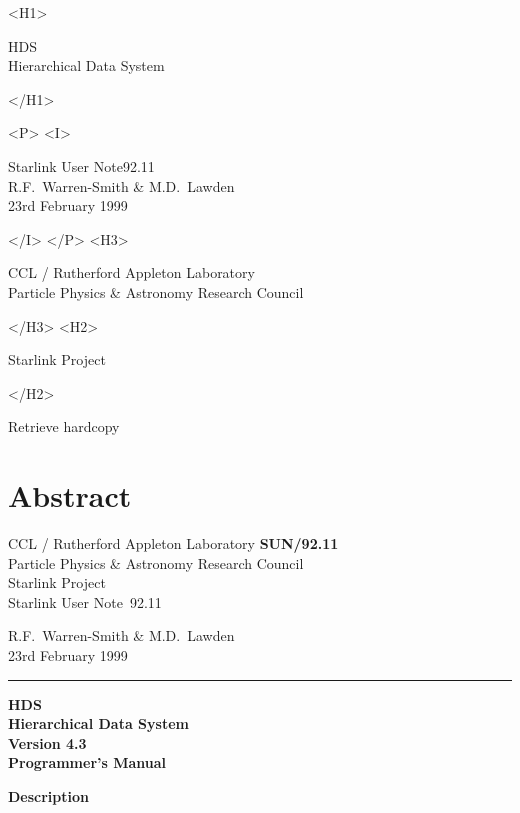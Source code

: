 \documentclass[11pt]{article}
\newcommand{\stardoccategory}  {Starlink User Note}
\newcommand{\stardocinitials}  {SUN}
\newcommand{\stardocsource}    {sun92.11}
\newcommand{\stardocnumber}    {92.11}
\newcommand{\stardocauthors}   {R.F.~Warren-Smith \& M.D.~Lawden}
\newcommand{\stardocdate}      {23rd February 1999}
\newcommand{\stardoctitle}     {HDS\\ [1ex]
                                Hierarchical Data System}
\newcommand{\stardocversion}   {Version 4.3}
\newcommand{\stardocmanual}    {Programmer's Manual}
\newcommand{\stardocname}{\stardocinitials /\stardocnumber}
\newcommand{\htmladdnormallink}[2]{#1}
\newcommand{\htmladdimg}[1]{}
\newenvironment{latexonly}{}{}
\newcommand{\xlabel}[1]{}
\begin{document}
\thispagestyle{empty}

\begin{htmlonly}
   \xlabel{}
   \label{stardoctoppage}
   \begin{rawhtml} <H1> \end{rawhtml}
      \stardoctitle
   \begin{rawhtml} </H1> \end{rawhtml}


   \begin{rawhtml} <P> <I> \end{rawhtml}
   \stardoccategory \stardocnumber \\
   \stardocauthors \\
   \stardocdate
   \begin{rawhtml} </I> </P> <H3> \end{rawhtml}
      \htmladdnormallink{CCL}{http://www.clrc.ac.uk/} /
      \htmladdnormallink{Rutherford Appleton Laboratory}
                        {http://www.clrc.ac.uk/ral/index.html} \\
      Particle Physics \& Astronomy Research Council \\
   \begin{rawhtml} </H3> <H2> \end{rawhtml}
      \htmladdnormallink{Starlink Project}{http://star-www.rl.ac.uk/}
   \begin{rawhtml} </H2> \end{rawhtml}
   \htmladdnormallink{\htmladdimg{source.gif} Retrieve hardcopy}
      {http://star-www.rl.ac.uk/cgi-bin/hcserver?\stardocsource}\\
   \section{\xlabel{abstract}Abstract}
\end{htmlonly}
\begin{latexonly}
   CCL / {\sc Rutherford Appleton Laboratory} \hfill {\bf \stardocname}\\
   {\large Particle Physics \& Astronomy Research Council}\\
   {\large Starlink Project\\}
   {\large \stardoccategory\ \stardocnumber}
   \begin{flushright}
   \stardocauthors\\
   \stardocdate
   \end{flushright}
   \vspace{-4mm}
   \rule{\textwidth}{0.5mm}
   \vspace{5mm}
   \begin{center}
   {\Huge\bf  \stardoctitle \\ [2.5ex]}
   {\LARGE\bf \stardocversion \\ [4ex]}
   {\Huge\bf  \stardocmanual}
   \end{center}
   \vspace{15mm}
   \begin{center}
   {\Large\bf Description}
   \end{center}
\end{latexonly}
\end{document}
